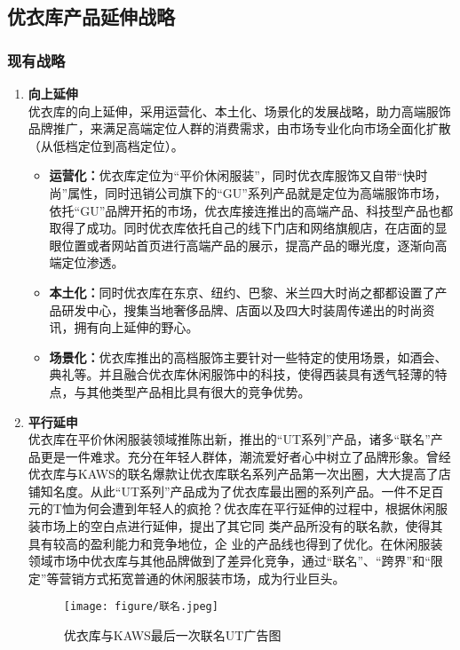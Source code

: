 \documentclass{xjtureport}
\begin{document}
\subsection{优衣库产品延伸战略}
\subsubsection{现有战略}
\begin{enumerate}
    \item \textbf{向上延伸}\\
    优衣库的向上延伸，采用运营化、本土化、场景化的发展战略，助力高端服饰品牌推广，来满足高端定位人群的消费需求，由市场专业化向市场全面化扩散（从低档定位到高档定位）。
    \begin{itemize}
        \item \textbf{运营化：}优衣库定位为“平价休闲服装”，同时优衣库服饰又自带“快时尚”属性，同时迅销公司旗下的“GU”系列产品就是定位为高端服饰市场，依托“GU”品牌开拓的市场，优衣库接连推出的高端产品、科技型产品也都取得了成功。同时优衣库依托自己的线下门店和网络旗舰店，在店面的显眼位置或者网站首页进行高端产品的展示，提高产品的曝光度，逐渐向高端定位渗透。
        \item \textbf{本土化：}同时优衣库在东京、纽约、巴黎、米兰四大时尚之都都设置了产品研发中心，搜集当地奢侈品牌、店面以及四大时装周传递出的时尚资讯，拥有向上延伸的野心。
        \item \textbf{场景化：}优衣库推出的高档服饰主要针对一些特定的使用场景，如酒会、典礼等。并且融合优衣库休闲服饰中的科技，使得西装具有透气轻薄的特点，与其他类型产品相比具有很大的竞争优势。
    \end{itemize}
    
    \item \textbf{平行延申}\\
    优衣库在平价休闲服装领域推陈出新，推出的“UT系列”产品，诸多“联名”产品更是一件难求。充分在年轻人群体，潮流爱好者心中树立了品牌形象。曾经优衣库与KAWS的联名爆款让优衣库联名系列产品第一次出圈，大大提高了店铺知名度\cite{ref13}。从此“UT系列”产品成为了优衣库最出圈的系列产品。一件不足百元的T恤为何会遭到年轻人的疯抢？优衣库在平行延伸的过程中，根据休闲服装市场上的空白点进行延伸，提出了其它同
    类产品所没有的联名款，使得其具有较高的盈利能力和竞争地位，企
    业的产品线也得到了优化。在休闲服装领域市场中优衣库与其他品牌做到了差异化竞争，通过“联名”、“跨界”和“限定”等营销方式拓宽普通的休闲服装市场，成为行业巨头。
    \begin{figure}[H]
        \centering
        \texttt{[image: figure/联名.jpeg]}
        \caption{优衣库与KAWS最后一次联名UT广告图}
    \end{figure}
\end{enumerate}
\end{document}
